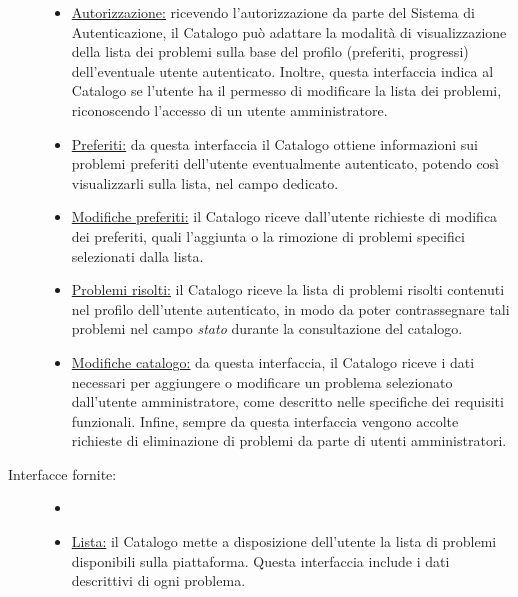 \documentclass[11pt, a4paper]{article}
\theoremstyle{definition} %
\begin{document}
\begin{description}
\begin{itemize}
        \item \underline{Autorizzazione:} ricevendo l'autorizzazione
        da parte del Sistema di Autenticazione, il Catalogo può adattare
        la modalità di visualizzazione della lista dei problemi sulla
        base del profilo (preferiti, progressi) dell'eventuale utente
        autenticato. Inoltre, questa interfaccia indica al Catalogo
        se l'utente ha il permesso di modificare la lista dei problemi,
        riconoscendo l'accesso di un utente amministratore.

        \item \underline{Preferiti:} da questa interfaccia il Catalogo
        ottiene informazioni sui problemi preferiti dell'utente
        eventualmente autenticato, potendo così visualizzarli sulla
        lista, nel campo dedicato.

        \item \underline{Modifiche preferiti:} il Catalogo riceve
        dall'utente richieste di modifica dei preferiti, quali
        l'aggiunta o la rimozione di problemi specifici selezionati
        dalla lista.

        \item \underline{Problemi risolti:} il Catalogo riceve la
        lista di problemi risolti contenuti nel profilo dell'utente
        autenticato, in modo da poter contrassegnare tali problemi
        nel campo \textit{stato} durante la consultazione del
        catalogo.

        \item \underline{Modifiche catalogo:} da questa interfaccia,
        il Catalogo riceve i dati necessari per aggiungere o modificare
        un problema selezionato dall'utente amministratore, come
        descritto nelle specifiche dei requisiti funzionali. Infine,
        sempre da questa interfaccia vengono accolte richieste di
        eliminazione di problemi da parte di utenti amministratori.
    \end{itemize}

    \item[Interfacce fornite:]
    \begin{itemize}
        \item[]

        \item \underline{Lista:} il Catalogo mette a disposizione
        dell'utente la lista di problemi disponibili sulla piattaforma.
        Questa interfaccia include i dati descrittivi di ogni problema.


\end{itemize}
\end{description}
\end{document}
